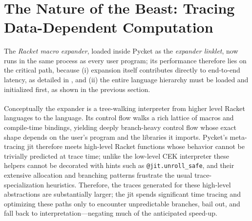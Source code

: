 	\section[\texorpdfstring{The Nature of the Beast: Tracing Data-Dependent Computation}{The Nature of the Beast}]{The Nature of the Beast: Tracing Data-Dependent Computation}
	\label{section:nature-of-the-beast}



		\paragraph{}%
			The \emph{Racket macro expander}, loaded inside Pycket as the \emph{expander linklet}, now runs in the same process as every user program; its performance therefore lies on the critical path, because (i) expansion itself contributes directly to end-to-end latency, as detailed in , and (ii) the entire language hierarchy must be loaded and initialized first, as shown in the previous section.

		\paragraph{}%
			Conceptually the expander is a tree-walking interpreter from higher level Racket languages to the  language. Its control flow walks a rich lattice of macros and compile-time bindings, yielding deeply branch-heavy control flow whose exact shape depends on the user's program and the libraries it imports. Pycket's meta-tracing \gls{jit} therefore meets high-level Racket functions whose behavior cannot be trivially predicted at trace time; unlike the low-level CEK interpreter these helpers cannot be decorated with hints such as \texttt{@jit.unroll\_safe}, and their extensive allocation and branching patterns frustrate the usual trace-specialization heuristics. Therefore, the traces generated for these high-level abstractions are substantially larger; the \gls{jit} spends significant time tracing and optimizing these paths only to encounter unpredictable branches, bail out, and fall back to interpretation—negating much of the anticipated speed-up.

